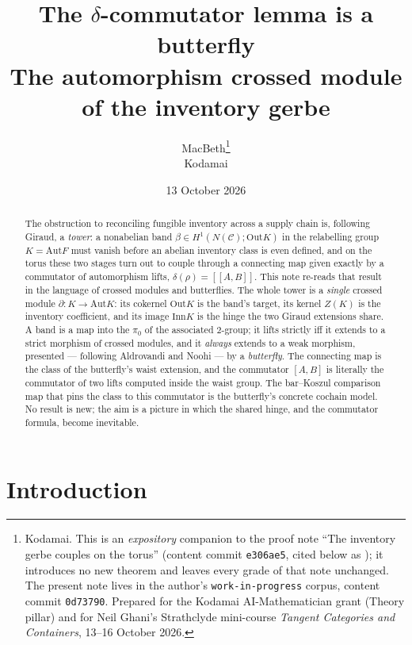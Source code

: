 \documentclass[11pt]{article}
\title{The $\delta$-commutator lemma is a butterfly\\
\large The automorphism crossed module of the inventory gerbe}
\author{MacBeth\thanks{Kodamai. This is an \emph{expository} companion to the proof note
``The inventory gerbe couples on the torus'' (content commit \texttt{e306ae5}, cited below as
\cite{capstone}); it introduces no new theorem and leaves every grade of that note unchanged.
The present note lives in the author's \texttt{work-in-progress} corpus, content commit
\texttt{0d73790}. Prepared for the Kodamai AI-Mathematician grant (Theory pillar) and for
Neil Ghani's Strathclyde mini-course \emph{Tangent Categories and Containers}, 13--16 October
2026.}\\
\small Kodamai}
\date{13 October 2026}
\theoremstyle{definition}
\newcommand{\C}{\mathcal{C}}
\newcommand{\Aut}{\mathrm{Aut}}
\newcommand{\Inn}{\mathrm{Inn}}
\newcommand{\Out}{\mathrm{Out}}
\begin{document}
\maketitle

\begin{abstract}
The obstruction to reconciling fungible inventory across a supply chain is, following Giraud, a
\emph{tower}: a nonabelian band $\beta\in H^1(N(\C);\Out K)$ in the relabelling group $K=\Aut F$
must vanish before an abelian inventory class is even defined, and on the torus these two stages
turn out to couple through a connecting map given exactly by a commutator of automorphism lifts,
$\delta(\rho)=[[A,B]]$. This note re-reads that result in the language of crossed modules and
butterflies. The whole tower is a \emph{single} crossed module $\partial\colon K\to\Aut K$: its
cokernel $\Out K$ is the band's target, its kernel $Z(K)$ is the inventory coefficient, and its
image $\Inn K$ is the hinge the two Giraud extensions share. A band is a map into the $\pi_0$ of
the associated $2$-group; it lifts strictly iff it extends to a strict morphism of crossed modules,
and it \emph{always} extends to a weak morphism, presented --- following Aldrovandi and Noohi --- by
a \emph{butterfly}. The connecting map is the class of the butterfly's waist extension, and the
commutator $[A,B]$ is literally the commutator of two lifts computed inside the waist group. The
bar--Koszul comparison map that pins the class to this commutator is the butterfly's concrete
cochain model. No result is new; the aim is a picture in which the shared hinge, and the
commutator formula, become inevitable.
\end{abstract}

\section{Introduction}\label{sec:intro}
\end{document}
